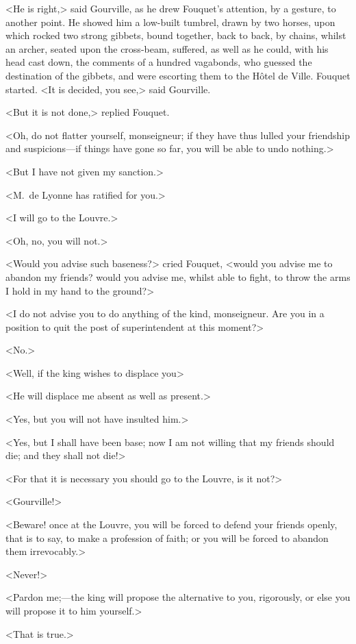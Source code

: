 <He is right,> said Gourville, as he drew Fouquet's attention, by a gesture, to another point. He showed him a low-built tumbrel, drawn by two horses, upon which rocked two strong gibbets, bound together, back to back, by chains, whilst an archer, seated upon the cross-beam, suffered, as well as he could, with his head cast down, the comments of a hundred vagabonds, who guessed the destination of the gibbets, and were escorting them to the Hôtel de Ville. Fouquet started. <It is decided, you see,> said Gourville.

<But it is not done,> replied Fouquet.

<Oh, do not flatter yourself, monseigneur; if they have thus lulled your friendship and suspicions—if things have gone so far, you will be able to undo nothing.>

<But I have not given my sanction.>

<M.~de Lyonne has ratified for you.>

<I will go to the Louvre.>

<Oh, no, you will not.>

<Would you advise such baseness?> cried Fouquet, <would you advise me to abandon my friends? would you advise me, whilst able to fight, to throw the arms I hold in my hand to the ground?>

<I do not advise you to do anything of the kind, monseigneur. Are you in a position to quit the post of superintendent at this moment?>

<No.>

<Well, if the king wishes to displace you\longdash>

<He will displace me absent as well as present.>

<Yes, but you will not have insulted him.>

<Yes, but I shall have been base; now I am not willing that my friends should die; and they shall not die!>

<For that it is necessary you should go to the Louvre, is it not?>

<Gourville!>

<Beware! once at the Louvre, you will be forced to defend your friends openly, that is to say, to make a profession of faith; or you will be forced to abandon them irrevocably.>

<Never!>

<Pardon me;—the king will propose the alternative to you, rigorously, or else you will propose it to him yourself.>

<That is true.>

